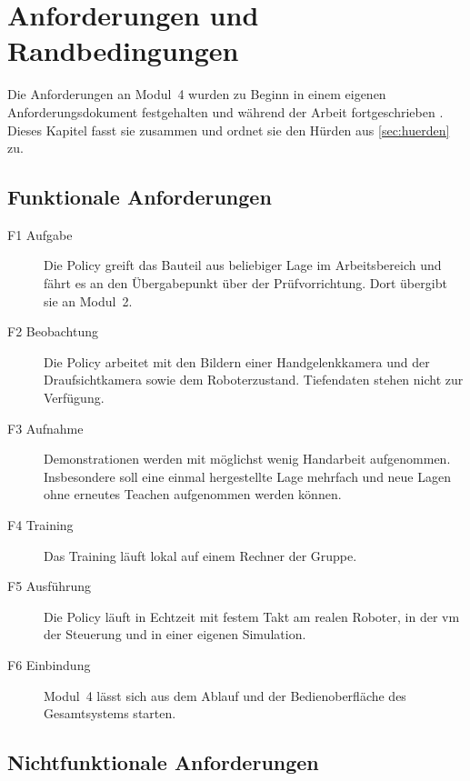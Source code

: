 \chapter{Anforderungen und Randbedingungen}
\label{ch:anforderungen}

Die Anforderungen an Modul~4 wurden zu Beginn in einem eigenen Anforderungsdokument
festgehalten und während der Arbeit fortgeschrieben
. Dieses Kapitel fasst sie zusammen und ordnet sie den
Hürden aus \cref{sec:huerden} zu.

\section{Funktionale Anforderungen}
\label{sec:anf-funktional}

\begin{description}
  \item[F1 Aufgabe] Die Policy greift das Bauteil aus beliebiger Lage im Arbeitsbereich und
    fährt es an den Übergabepunkt über der Prüfvorrichtung. Dort übergibt sie an Modul~2.
  \item[F2 Beobachtung] Die Policy arbeitet mit den Bildern einer Handgelenkkamera und der
    Draufsichtkamera sowie dem Roboterzustand. Tiefendaten stehen nicht zur Verfügung.
  \item[F3 Aufnahme] Demonstrationen werden mit möglichst wenig Handarbeit aufgenommen.
    Insbesondere soll eine einmal hergestellte Lage mehrfach und neue Lagen ohne erneutes
    Teachen aufgenommen werden können.
  \item[F4 Training] Das Training läuft lokal auf einem Rechner der Gruppe.
  \item[F5 Ausführung] Die Policy läuft in Echtzeit mit festem Takt am realen Roboter, in der
    \ac{vm} der Steuerung und in einer eigenen Simulation.
  \item[F6 Einbindung] Modul~4 lässt sich aus dem Ablauf und der Bedienoberfläche des
    Gesamtsystems starten.
\end{description}

\section{Nichtfunktionale Anforderungen}
\label{sec:anf-nichtfunktional}

